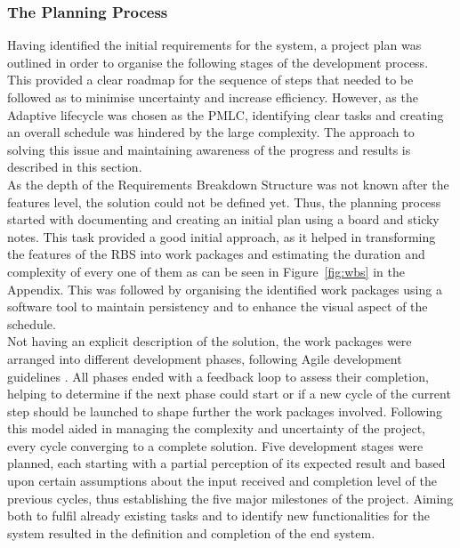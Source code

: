 \subsubsection{The Planning Process}
Having identified the initial requirements for the system, a project plan was outlined in order to organise the following stages of the development process. This provided a clear roadmap for the sequence of steps that needed to be followed as to minimise uncertainty and increase efficiency. However, as the Adaptive lifecycle was chosen as the PMLC, identifying clear tasks and creating an overall schedule was hindered by the large complexity. The approach to solving this issue and maintaining awareness of the progress and results is described in this section.\\

As the depth of the Requirements Breakdown Structure was not known after the features level, the solution could not be defined yet. Thus, the planning process started with documenting and creating an initial plan using a board and sticky notes. This task provided a good initial approach, as it helped in transforming the features of the RBS into work packages and estimating the duration and complexity of every one of them as can be seen in Figure~\ref{fig:wbs} in the Appendix. This was followed by organising the identified work packages using a software tool to maintain persistency and to enhance the visual aspect of the schedule.\\

Not having an explicit description of the solution, the work packages were arranged into different development phases, following Agile development guidelines \cite{wysocki_2013}. All phases ended with a feedback loop to assess their completion, helping to determine if the next phase could start or if a new cycle of the current step should be launched to shape further the work packages involved. Following this model aided in managing the complexity and uncertainty of the project, every cycle converging to a complete solution. Five development stages were planned, each starting with a partial perception of its expected result and based upon certain assumptions about the input received and completion level of the previous cycles, thus establishing the five major milestones of the project. Aiming both to fulfil already existing tasks and to identify new functionalities for the system resulted in the definition and completion of the end system.\\

